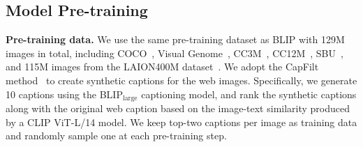 










\vspace{-0.5ex}
\subsection{Model Pre-training}
\vspace{-0.5ex}
\noindent\textbf{Pre-training data.}
We use the same pre-training dataset as BLIP with 129M images in total,
including COCO~\cite{coco}, Visual Genome~\cite{VG}, CC3M~\cite{CC}, CC12M~\cite{cc12m}, SBU~\cite{sbu}, and 115M images from the LAION400M dataset~\cite{laion}.
We adopt the CapFilt method~\cite{blip} to create synthetic captions for the web images.
Specifically, we generate 10 captions using the BLIP$_\mathrm{large}$ captioning model, and rank the synthetic captions along with the original web caption based on the image-text similarity produced by a CLIP ViT-L/14 model.
We keep top-two captions per image as training data and randomly sample one at each pre-training step.


